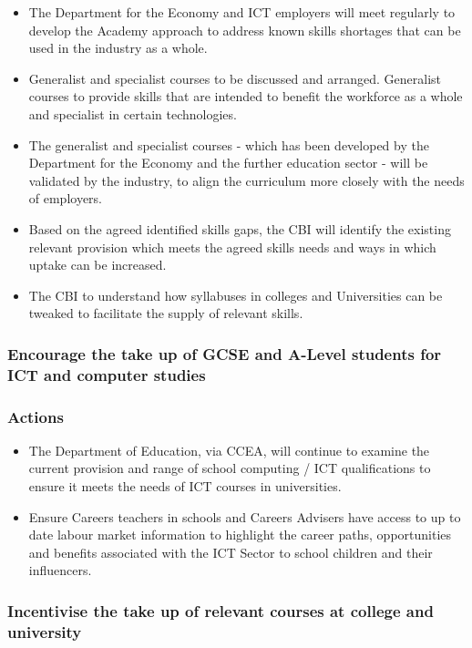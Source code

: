 \begin{itemize}
    \item The Department for the Economy and ICT employers will meet regularly to develop the Academy approach to address known skills shortages that can be used in the industry as a whole.
    \item Generalist and specialist courses to be discussed and arranged. Generalist courses to provide skills that are intended to benefit the workforce as a whole and specialist in certain technologies.
    \item The generalist and specialist courses - which has been developed by the Department for the Economy and the further education sector - will be validated by the industry, to align the curriculum more closely with the needs of employers.
    \item Based on the agreed identified skills gaps, the CBI will identify the existing relevant provision which meets the agreed skills needs and ways in which uptake can be increased.
    \item The CBI to understand how syllabuses in colleges and Universities can be tweaked to facilitate the supply of relevant skills.
\end{itemize}

\subsubsection{Encourage the take up of GCSE and A-Level students for ICT and computer studies}

\subsubsection{Actions}

\begin{itemize}
    \item The Department of Education, via CCEA, will continue to examine the current provision and range of school computing / ICT qualifications to ensure it meets the needs of ICT courses in universities.
    \item Ensure Careers teachers in schools and Careers Advisers have access to up to date labour market information to highlight the career paths, opportunities and benefits associated with the ICT Sector to school children and their influencers.
\end{itemize}

\subsubsection{Incentivise the take up of relevant courses at college and university}


